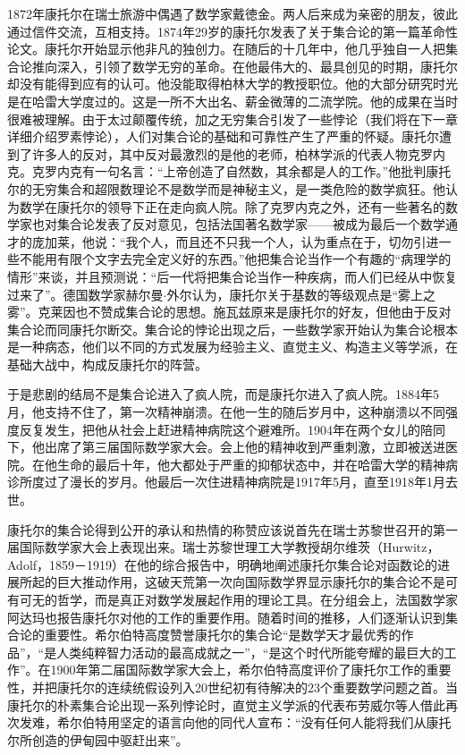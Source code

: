 \documentclass{article}
\begin{document}
1872年康托尔在瑞士旅游中偶遇了数学家戴徳金。两人后来成为亲密的朋友，彼此通过信件交流，互相支持。1874年29岁的康托尔发表了关于集合论的第一篇革命性论文。康托尔开始显示他非凡的独创力。在随后的十几年中，他几乎独自一人把集合论推向深入，引领了数学无穷的革命。在他最伟大的、最具创见的时期，康托尔却没有能得到应有的认可。他没能取得柏林大学的教授职位。他的大部分研究时光是在哈雷大学度过的。这是一所不大出名、薪金微薄的二流学院。他的成果在当时很难被理解。由于太过颠覆传统，加之无穷集合引发了一些悖论（我们将在下一章详细介绍罗素悖论），人们对集合论的基础和可靠性产生了严重的怀疑。康托尔遭到了许多人的反对，其中反对最激烈的是他的老师，柏林学派的代表人物克罗内克。克罗内克有一句名言：“上帝创造了自然数，其余都是人的工作。”他批判康托尔的无穷集合和超限数理论不是数学而是神秘主义，是一类危险的数学疯狂。他认为数学在康托尔的领导下正在走向疯人院。除了克罗内克之外，还有一些著名的数学家也对集合论发表了反对意见，包括法国著名数学家——被成为最后一个数学通才的庞加莱，他说：“我个人，而且还不只我一个人，认为重点在于，切勿引进一些不能用有限个文字去完全定义好的东西。”他把集合论当作一个有趣的“病理学的情形”来谈，并且预测说：“后一代将把集合论当作一种疾病，而人们已经从中恢复过来了”。德国数学家赫尔曼$\cdot$外尔认为，康托尔关于基数的等级观点是“雾上之雾”。克莱因也不赞成集合论的思想。施瓦兹原来是康托尔的好友，但他由于反对集合论而同康托尔断交。集合论的悖论出现之后，一些数学家开始认为集合论根本是一种病态，他们以不同的方式发展为经验主义、直觉主义、构造主义等学派，在基础大战中，构成反康托尔的阵营。

于是悲剧的结局不是集合论进入了疯人院，而是康托尔进入了疯人院。1884年5月，他支持不住了，第一次精神崩溃。在他一生的随后岁月中，这种崩溃以不同强度反复发生，把他从社会上赶进精神病院这个避难所。1904年在两个女儿的陪同下，他出席了第三届国际数学家大会。会上他的精神收到严重刺激，立即被送进医院。在他生命的最后十年，他大都处于严重的抑郁状态中，并在哈雷大学的精神病诊所度过了漫长的岁月。他最后一次住进精神病院是1917年5月，直至1918年1月去世。

康托尔的集合论得到公开的承认和热情的称赞应该说首先在瑞士苏黎世召开的第一届国际数学家大会上表现出来。瑞士苏黎世理工大学教授胡尔维茨（Hurwitz，Adolf，1859－1919）在他的综合报告中，明确地阐述康托尔集合论对函数论的进展所起的巨大推动作用，这破天荒第一次向国际数学界显示康托尔的集合论不是可有可无的哲学，而是真正对数学发展起作用的理论工具。在分组会上，法国数学家阿达玛也报告康托尔对他的工作的重要作用。随着时间的推移，人们逐渐认识到集合论的重要性。希尔伯特高度赞誉康托尔的集合论“是数学天才最优秀的作品”，“是人类纯粹智力活动的最高成就之一”，“是这个时代所能夸耀的最巨大的工作”。在1900年第二届国际数学家大会上，希尔伯特高度评价了康托尔工作的重要性，并把康托尔的连续统假设列入20世纪初有待解决的23个重要数学问题之首。当康托尔的朴素集合论出现一系列悖论时，直觉主义学派的代表布劳威尔等人借此再次发难，希尔伯特用坚定的语言向他的同代人宣布：“没有任何人能将我们从康托尔所创造的伊甸园中驱赶出来”。
\end{document}
